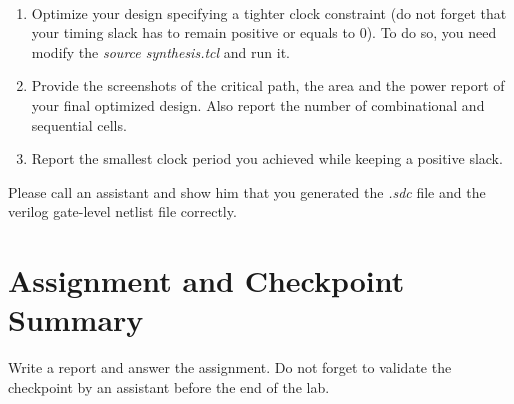 	\begin{exercise}\
	\vspace{-6mm}
	\begin{enumerate}
\item Optimize your design specifying a tighter clock constraint (do not forget that your timing slack has to remain positive or equals to 0). To do so, you need modify the \textit{source synthesis.tcl} and run it.
\item Provide the screenshots of the critical path, the area and the power report of your final optimized design. Also report the number of combinational and sequential cells.
\item Report the smallest clock period you achieved while keeping a positive slack.
	\end{enumerate}
	\vspace{-5mm}
\end{exercise}


\begin{checkpoint}\label{check1}
	Please call an assistant and show him that you generated the \textit{.sdc} file and the verilog gate-level netlist file correctly.
\end{checkpoint}

\section{Assignment and Checkpoint Summary}
Write a report and answer the assignment. Do not forget to validate the checkpoint by an assistant before the end of the lab.